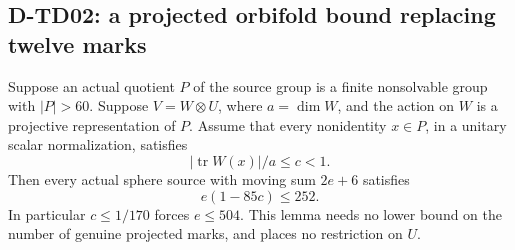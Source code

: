 \subsection{D-TD02: a projected orbifold bound replacing twelve marks}

\begin{lemma}[D-TD02]
Suppose an actual quotient \(P\) of the source group is a finite
nonsolvable group with \(|P|>60\).  Suppose
\(V=W\otimes U\), where \(a=\dim W\), and the action on \(W\)
is a projective representation of \(P\).
Assume that every nonidentity \(x\in P\), in a unitary scalar
normalization, satisfies
\[
                         |\operatorname{tr}W(x)|/a\le c<1 .
                         \tag{TD.11}
\]
Then every actual sphere source with moving sum \(2e+6\) satisfies
\[
                               e(1-85c)\le252 .
                               \tag{TD.12}
\]
In particular \(c\le1/170\) forces \(e\le504\).
This lemma needs no lower bound on the number of genuine projected
marks, and places no restriction on \(U\).
\end{lemma}

